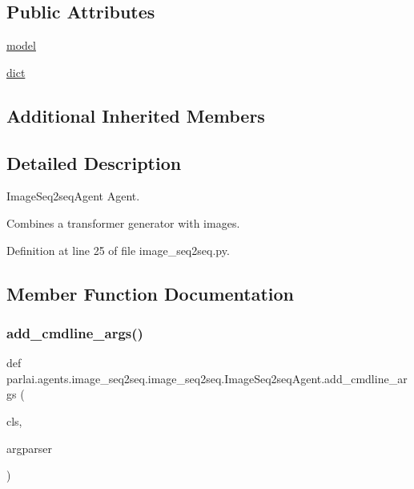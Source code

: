\subsection*{Public Attributes}
\begin{DoxyCompactItemize}
\item 
\hyperlink{classparlai_1_1agents_1_1image__seq2seq_1_1image__seq2seq_1_1ImageSeq2seqAgent_ac9d0f2cb0dd0d8dfcfa4479d00e05333}{model}
\item 
\hyperlink{classparlai_1_1agents_1_1image__seq2seq_1_1image__seq2seq_1_1ImageSeq2seqAgent_aed18dcaf8ee51691533e93add8383106}{dict}
\end{DoxyCompactItemize}
\subsection*{Additional Inherited Members}


\subsection{Detailed Description}
\begin{DoxyVerb}ImageSeq2seqAgent Agent.

Combines a transformer generator with images.
\end{DoxyVerb}
 

Definition at line 25 of file image\+\_\+seq2seq.\+py.



\subsection{Member Function Documentation}
\mbox{\label{classparlai_1_1agents_1_1image__seq2seq_1_1image__seq2seq_1_1ImageSeq2seqAgent_a78d8fe5aa1f336ee6a96bcdb4adb0e70}} 
\subsubsection{\texorpdfstring{add\+\_\+cmdline\+\_\+args()}{add\_cmdline\_args()}}
{\footnotesize\ttfamily def parlai.\+agents.\+image\+\_\+seq2seq.\+image\+\_\+seq2seq.\+Image\+Seq2seq\+Agent.\+add\+\_\+cmdline\+\_\+args (\begin{DoxyParamCaption}\item[{}]{cls,  }\item[{}]{argparser }\end{DoxyParamCaption})}

